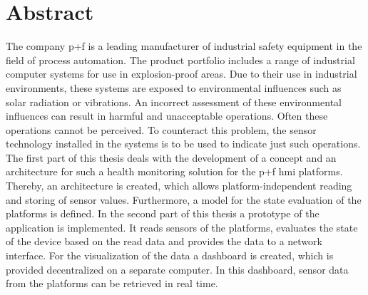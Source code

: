 \chapter*{Abstract}
The company \ac{p+f} is a leading manufacturer of industrial safety equipment in the field of process automation. The product portfolio includes a range of industrial computer systems for use in explosion-proof areas. Due to their use in industrial environments, these systems are exposed to environmental influences such as solar radiation or vibrations. An incorrect assessment of these environmental influences can result in harmful and unacceptable operations. Often these operations cannot be perceived. To counteract this problem, the sensor technology installed in the systems is to be used to indicate just such operations.\\
The first part of this thesis deals with the development of a concept and an architecture for such a health monitoring solution for the \acl{p+f} \ac{hmi} platforms. Thereby, an architecture is created, which allows platform-independent reading and storing of sensor values. Furthermore, a model for the state evaluation of the platforms is defined.
In the second part of this thesis a prototype of the application is implemented. It reads sensors of the platforms, evaluates the state of the device based on the read data and provides the data to a network interface.
For the visualization of the data a dashboard is created, which is provided decentralized on a separate computer. In this dashboard, sensor data from the platforms can be retrieved in real time.